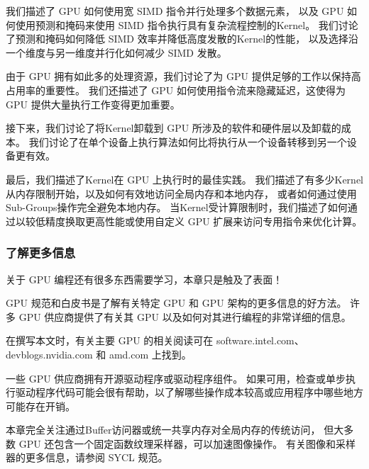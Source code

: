 我们描述了 GPU 如何使用宽 SIMD 指令并行处理多个数据元素，
以及 GPU 如何使用预测和掩码来使用 SIMD 指令执行具有复杂流程控制的Kernel。 
我们讨论了预测和掩码如何降低 SIMD 效率并降低高度发散的Kernel的性能，
以及选择沿一个维度与另一维度并行化如何减少 SIMD 发散。

由于 GPU 拥有如此多的处理资源，我们讨论了为 GPU 提供足够的工作以保持高占用率的重要性。 
我们还描述了 GPU 如何使用指令流来隐藏延迟，这使得为 GPU 提供大量执行工作变得更加重要。

接下来，我们讨论了将Kernel卸载到 GPU 所涉及的软件和硬件层以及卸载的成本。 
我们讨论了在单个设备上执行算法如何比将执行从一个设备转移到另一个设备更有效。

最后，我们描述了Kernel在 GPU 上执行时的最佳实践。 
我们描述了有多少Kernel从内存限制开始，以及如何有效地访问全局内存和本地内存，
或者如何通过使用Sub-Groups操作完全避免本地内存。 
当Kernel受计算限制时，我们描述了如何通过以较低精度换取更高性能或使用自定义 GPU 扩展来访问专用指令来优化计算。

\subsubsection{了解更多信息}
关于 GPU 编程还有很多东西需要学习，本章只是触及了表面！

GPU 规范和白皮书是了解有关特定 GPU 和 GPU 架构的更多信息的好方法。 
许多 GPU 供应商提供了有关其 GPU 以及如何对其进行编程的非常详细的信息。

在撰写本文时，有关主要 GPU 的相关阅读可在 software.intel.com、devblogs.nvidia.com 和 amd.com 上找到。

一些 GPU 供应商拥有开源驱动程序或驱动程序组件。 
如果可用，检查或单步执行驱动程序代码可能会很有帮助，以了解哪些操作成本较高或应用程序中哪些地方可能存在开销。

本章完全关注通过Buffer访问器或统一共享内存对全局内存的传统访问，
但大多数 GPU 还包含一个固定函数纹理采样器，可以加速图像操作。 有关图像和采样器的更多信息，请参阅 SYCL 规范。